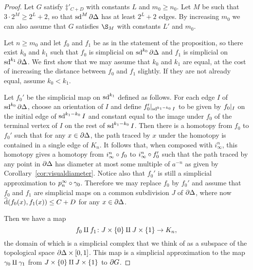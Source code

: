 \documentclass[a4paper]{article}
\begin{document}
\begin{proof}
  Let $G$ satisfy $\ddag'_{C+D}$ with constants $L$ and $m_0 \geq n_0$.
  Let $M$ be such that $3\cdot2^M \geq 2^L+2$, so that $\operatorname{sd}^M\partial\Delta$
  has at least $2^L+2$ edges.  By increasing $m_0$ we can also assume that $G$
  satisfies $\S_M$ with constants $L'$ and $m_0$.

  Let $n \geq m_0$ and let $f_0$ and $f_1$ be as in the statement of the
  proposition, so there exist $k_0$ and $k_1$ such that $f_0$ is simplicial on
  $\operatorname{sd}^{k_0}\partial\Delta$ and $f_1$ is simplicial on
  $\operatorname{sd}^{k_1}\partial\Delta$. We first show that we may assume that $k_0$ and
  $k_1$ are equal, at the cost of increasing the distance between $f_0$ and
  $f_1$ slightly. If they are not already equal, assume $k_0 < k_1$.

  Let $f_0'$ be the simplicial map on $\operatorname{sd}^{k_1}$ defined as follows. For each
  edge $I$ of $\operatorname{sd}^{k_0}\partial\Delta$, choose an orientation of $I$ and
  define $f_0'\vert_{\operatorname{sd}^{k_1-k_0}I}$ to be given by $f_0\vert_{I}$
  on the initial edge of $\operatorname{sd}^{k_1-k_0}I$ and constant equal to the image under
  $f_0$ of the terminal vertex of $I$ on the rest of $\operatorname{sd}^{k_1-k_0}I$. Then
  there is a homotopy from $f_0$ to $f_0'$ such that for any $x \in
  \partial\Delta$, the path traced by $x$ under the homotopy is contained in a
  single edge of $K_n$.  It follows that, when composed with $i^n_\infty$, this
  homotopy gives a homotopy from $i^n_\infty\circ f_0$ to $i^n_\infty
  \circ f_0'$ such that the path traced by any point in $\partial\Delta$
  has diameter at most some multiple of $a^{-n}$ as given by
  Corollary~\ref{cor:visualdiameter}.  Notice also that $f_0'$ is still a
  simplicial approximation to $p^\infty_n\circ\gamma_0$.  Therefore we may
  replace $f_0$ by $f_0'$ and assume that $f_0$ and $f_1$ are simplicial maps
  on a common subdivision $J$ of $\partial\Delta$, where now $\operatorname{\widehat{d}}(f_0(x),
  f_1(x))\leq C+D$ for any $x \in \partial\Delta$.
  
  Then we have a map 
  \begin{equation*}
    f_0 \amalg f_1 \colon J \times \{0\} \amalg J \times \{1\}
          \to K_n,
  \end{equation*}
  the domain of which is a simplicial complex that we think of as a subspace of
  the topological space $\partial\Delta\times[0,1]$. This map is a
  simplicial approximation to the map $\gamma_0 \amalg \gamma_1$ from
  $J\times\{0\} \amalg J \times\{1\}$ to $\partial G$. 
  

\end{proof}
\end{document}
